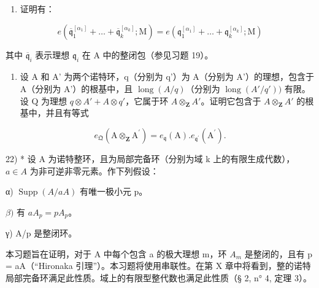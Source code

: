 \begin{enumerate}
\def\labelenumi{\alph{enumi})}
\setcounter{enumi}{5}
\tightlist
\item
  证明有：
\end{enumerate}

\[
e \left(\overline {{{\mathfrak {q}}}} _ {1} ^ {[ \alpha_ {1} ]} + \dots + \overline {{{\mathfrak {q}}}} _ {k} ^ {[ \alpha_ {k} ]}; \mathrm{M}\right) = e \left(\mathfrak {q} _ {1} ^ {[ \alpha_ {1} ]} + \dots + \mathfrak {q} _ {k} ^ {[ \alpha_ {k} ]}; \mathrm{M}\right)
\]

其中 \(\overline{\mathfrak{q}}_{i}\) 表示理想 \(\mathfrak{q}_{i}\) 在 A 中的整闭包（参见习题 19）。

\begin{enumerate}
\def\labelenumi{\arabic{enumi})}
\setcounter{enumi}{20}
\tightlist
\item
  设 A 和 A' 为两个诺特环，q（分别为 q'）为 A（分别为 A'）的理想，包含于 A（分别为 A'）的根基中，且 \(\operatorname{long}(A/q)\)（分别为 \(\operatorname{long}(A'/q'))\) 有限。设 Q 为理想 \(q \otimes A' + A \otimes q'\)，它属于环 \(A \otimes_{\mathbf{Z}} A'\)。证明它包含于 \(A \otimes_{\mathbf{Z}} A'\) 的根基中，并且有等式
\end{enumerate}

\[
e _ {\mathfrak {Q}} (\mathrm{A} \otimes_ {\mathbf {Z}} \mathrm{A} ^ {\prime}) = e _ {\mathfrak {q}} (\mathrm{A}). e _ {\mathfrak {q} ^ {\prime}} (\mathrm{A} ^ {\prime}).
\]

22) * 设 A 为诺特整环，且为局部完备环（分别为域 k 上的有限生成代数），\(a \in A\) 为非可逆非零元素。作下列假设：

α) \(\operatorname{Supp}(A/aA)\) 有唯一极小元 p。

\(\beta)\) 有 \(aA_{p} = pA_{p}\)。

γ) A/p 是整闭环。

本习题旨在证明，对于 A 中每个包含 a 的极大理想 m，环 \(A_{m}\) 是整闭的，且有 p = aA（“Hironaka 引理”）。本习题将使用串联性。在第 X 章中将看到，整的诺特局部完备环满足此性质。域上的有限型整代数也满足此性质（§ 2, n° 4, 定理 3）。


